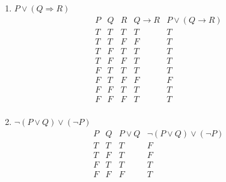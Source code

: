 \documentclass{article}
\begin{document}
\subsection{}
\begin{enumerate}
    \item $P \vee (Q \Rightarrow R)$
    \[
    \begin{array}{c|c|c|c|c}
        P & Q & R & Q \to R & P \lor (Q \to R) \\ \hline
        T & T & T &    T    &        T         \\ \hline
        T & T & F &    F    &        T         \\ \hline
        T & F & T &    T    &        T         \\ \hline
        T & F & F &    T    &        T         \\ \hline
        F & T & T &    T    &        T         \\ \hline
        F & T & F &    F    &        F         \\ \hline
        F & F & T &    T    &        T         \\ \hline
        F & F & F &    T    &        T         \\
    
    \end{array}
    \]

    \setcounter{enumi}{3}
    \item $\neg (P \lor Q) \lor (\neg P)$
    \[
    \begin{array}{c|c|c|c}
        P & Q & P \lor Q & \neg (P \lor Q) \lor (\neg P) \\ \hline
        T & T &    T     &               F               \\ \hline
        T & F &    T     &               F               \\ \hline
        F & T &    T     &               T               \\ \hline
        F & F &    F     &               T               \\
    
    \end{array}
    \]


\end{enumerate}
\end{document}
